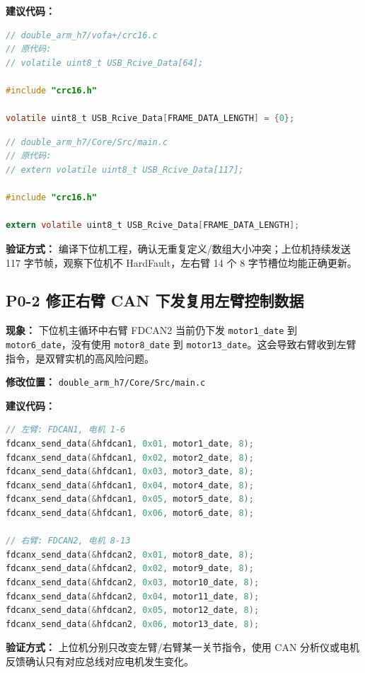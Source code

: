 \documentclass[UTF8,a4paper,11pt]{ctexart}
\begin{document}
\textbf{建议代码：}
\begin{lstlisting}[language=C]
// double_arm_h7/vofa+/crc16.c
// 原代码:
// volatile uint8_t USB_Rcive_Data[64];

#include "crc16.h"

volatile uint8_t USB_Rcive_Data[FRAME_DATA_LENGTH] = {0};
\end{lstlisting}

\begin{lstlisting}[language=C]
// double_arm_h7/Core/Src/main.c
// 原代码:
// extern volatile uint8_t USB_Rcive_Data[117];

#include "crc16.h"

extern volatile uint8_t USB_Rcive_Data[FRAME_DATA_LENGTH];
\end{lstlisting}

\textbf{验证方式：} 编译下位机工程，确认无重复定义/数组大小冲突；上位机持续发送 117 字节帧，观察下位机不 HardFault，左右臂 14 个 8 字节槽位均能正确更新。

\subsection{P0-2 修正右臂 CAN 下发复用左臂控制数据}

\textbf{现象：} 下位机主循环中右臂 FDCAN2 当前仍下发 \verb|motor1_date| 到 \verb|motor6_date|，没有使用 \verb|motor8_date| 到 \verb|motor13_date|。这会导致右臂收到左臂指令，是双臂实机的高风险问题。

\textbf{修改位置：} \verb|double_arm_h7/Core/Src/main.c|

\textbf{建议代码：}
\begin{lstlisting}[language=C]
// 左臂: FDCAN1, 电机 1-6
fdcanx_send_data(&hfdcan1, 0x01, motor1_date, 8);
fdcanx_send_data(&hfdcan1, 0x02, motor2_date, 8);
fdcanx_send_data(&hfdcan1, 0x03, motor3_date, 8);
fdcanx_send_data(&hfdcan1, 0x04, motor4_date, 8);
fdcanx_send_data(&hfdcan1, 0x05, motor5_date, 8);
fdcanx_send_data(&hfdcan1, 0x06, motor6_date, 8);

// 右臂: FDCAN2, 电机 8-13
fdcanx_send_data(&hfdcan2, 0x01, motor8_date, 8);
fdcanx_send_data(&hfdcan2, 0x02, motor9_date, 8);
fdcanx_send_data(&hfdcan2, 0x03, motor10_date, 8);
fdcanx_send_data(&hfdcan2, 0x04, motor11_date, 8);
fdcanx_send_data(&hfdcan2, 0x05, motor12_date, 8);
fdcanx_send_data(&hfdcan2, 0x06, motor13_date, 8);
\end{lstlisting}

\textbf{验证方式：} 上位机分别只改变左臂/右臂某一关节指令，使用 CAN 分析仪或电机反馈确认只有对应总线对应电机发生变化。
\end{document}
